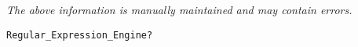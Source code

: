\label{pkg:dfa\_engine}

{\tiny \it The above information is manually maintained and may contain errors.}
\begin{verbatim}
Regular_Expression_Engine?
\end{verbatim}
